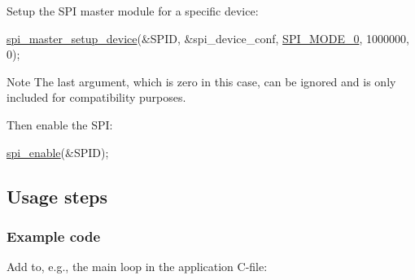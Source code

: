 \begin{DoxyEnumerate}
\begin{DoxyItemize}
\end{DoxyItemize}
\item Setup the S\-P\-I master module for a specific device\-:
\begin{DoxyItemize}
\item 
\begin{DoxyCode}
        \hyperlink{group__xmega__spi__master__group_ga81164f6dd2297a64337f3a052171e0f8}{spi\_master\_setup\_device}(&SPID, &spi\_device\_conf,
       \hyperlink{group__xmega__spi__master__group_ga1ec07ad94d5f6276c1c0b41d0550fe52}{SPI\_MODE\_0}, 1000000, 0);
\end{DoxyCode}

\item \begin{DoxyNote}{Note}
The last argument, which is zero in this case, can be ignored and is only included for compatibility purposes.
\end{DoxyNote}

\end{DoxyItemize}
\item Then enable the S\-P\-I\-:
\begin{DoxyItemize}
\item 
\begin{DoxyCode}
        \hyperlink{group__xmega__spi__master__group_ga82974e81370360e53b1276113de8a462}{spi\_enable}(&SPID);
\end{DoxyCode}

\end{DoxyItemize}
\end{DoxyEnumerate}\hypertarget{spi_master_xmega_spi_master_xmega_basic_usage}{}\subsection{Usage steps}\label{spi_master_xmega_spi_master_xmega_basic_usage}
\hypertarget{spi_master_xmega_spi_master_xmega_basic_usage_code}{}\subsubsection{Example code}\label{spi_master_xmega_spi_master_xmega_basic_usage_code}
Add to, e.\-g., the main loop in the application C-\/file\-: 
